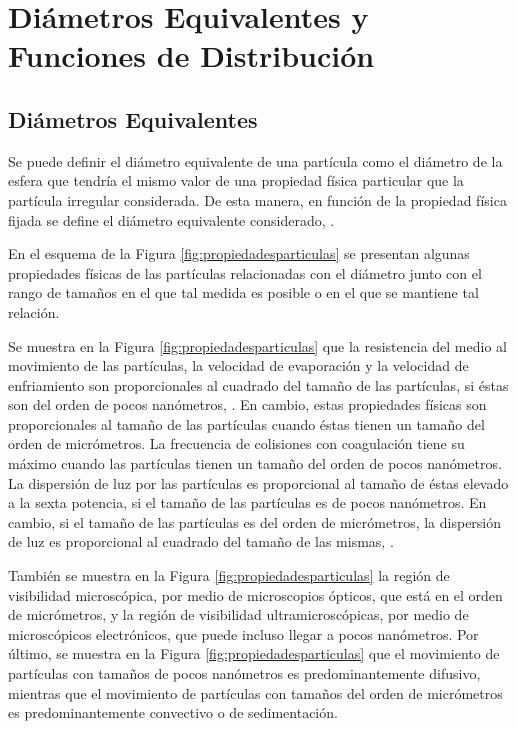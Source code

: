 \section{Diámetros Equivalentes y Funciones de Distribución}\label{sec:diametrosyfuncionesequivalentes}

\subsection{Diámetros Equivalentes} \label{sub:diametros}

\par Se puede definir el diámetro equivalente de una partícula como el diámetro de la esfera que tendría el mismo valor de una propiedad física particular que la partícula irregular considerada. De esta manera, en función de la propiedad física fijada se define el diámetro equivalente considerado, \cite{friedlander:2000}.

\par En el esquema de la Figura \ref{fig:propiedadesparticulas} se presentan algunas propiedades físicas de las partículas relacionadas con el diámetro junto con el rango de tamaños en el que tal medida es posible o en el que se mantiene tal relación.

\par Se muestra en la Figura \ref{fig:propiedadesparticulas} que la resistencia del medio al movimiento de las partículas, la velocidad de evaporación y la velocidad de enfriamiento son proporcionales al cuadrado del tamaño de las partículas, si éstas son del orden de pocos nanómetros, \cite{fuchs:1989}. En cambio, estas propiedades físicas son proporcionales al tamaño de las partículas cuando éstas tienen un tamaño del orden de micrómetros. La frecuencia de colisiones con coagulación tiene su máximo cuando las partículas tienen un tamaño del orden de pocos nanómetros. La dispersión de luz por las partículas es proporcional al tamaño de éstas elevado a la sexta potencia, si el tamaño de las partículas es de pocos nanómetros. En cambio, si el tamaño de las partículas es del orden de micrómetros, la dispersión de luz es proporcional al cuadrado del tamaño de las mismas, \cite{fuchs:1989}.

\par También se muestra en la Figura \ref{fig:propiedadesparticulas} la región de visibilidad microscópica, por medio de microscopios ópticos, que está en el orden de micrómetros, y la región de visibilidad ultramicroscópicas, por medio de microscópicos electrónicos, que puede incluso llegar a pocos nanómetros. Por último, se muestra en la Figura \ref{fig:propiedadesparticulas} que el movimiento de partículas con tamaños de pocos nanómetros es predominantemente difusivo, mientras que el movimiento de partículas con tamaños del orden de micrómetros es predominantemente convectivo o de sedimentación.

